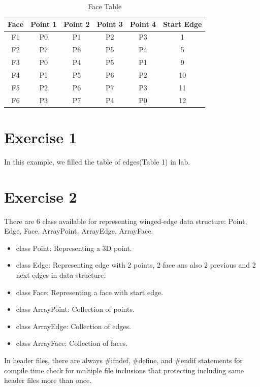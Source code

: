 \documentclass{article}
\begin{document}
\begin{table}[H]
\centering
    \begin{tabular}{|c|c|c|c|c|c|}
    \hline
    Face & Point 1 & Point 2 & Point 3 & Point 4 & Start Edge \\ \hline
    F1   & P0      & P1      & P2      & P3      & 1          \\ \hline
    F2   & P7      & P6      & P5      & P4      & 5          \\ \hline
    F3   & P0      & P4      & P5      & P1      & 9          \\ \hline
    F4   & P1      & P5      & P6      & P2      & 10         \\ \hline
    F5   & P2      & P6      & P7      & P3      & 11         \\ \hline
    F6   & P3      & P7      & P4      & P0      & 12         \\ \hline
    \end{tabular}
    \caption {Face Table}
\end{table}


\section{Exercise 1}

In this example, we filled the table of edges(Table 1) in lab.

\section{Exercise 2}

There are 6 class available for representing winged-edge data structure: Point, Edge, Face, ArrayPoint, ArrayEdge, ArrayFace.

\begin{itemize}
\item class Point: Representing a 3D point.
\item class Edge:  Representing edge with 2 points, 2 face ans also 2 previous and 2 next edges in data structure.
\item class Face: Representing a face with start edge.
\item class ArrayPoint: Collection of points.
\item class ArrayEdge: Collection of edges.
\item class ArrayFace: Collection of faces.
\end{itemize}

In header files, there are always \#ifndef, \#define, and \#endif statements for compile time check for multiple file inclusions that protecting including same header files more than once.
\end{document}
